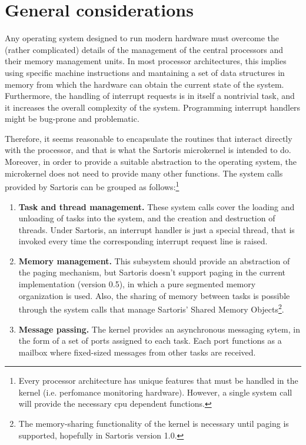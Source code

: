 \documentclass[11pt, letterpaper, twoside, english]{book}
\begin{document}
\section{General considerations}
Any operating system designed to run modern hardware must overcome the (rather complicated) details of the management of the central processors and their memory management units. In most processor architectures, this implies using specific machine instructions and mantaining a set of data structures in memory from which the hardware can obtain the current state of the system. Furthermore, the handling of interrupt requests is in itself a nontrivial task, and it increases the overall complexity of the system. Programming interrupt handlers might be bug-prone and problematic.

Therefore, it seems reasonable to encapsulate the routines that interact directly with the processor, and that is what the Sartoris microkernel is intended to do. Moreover, in order to provide a suitable abstraction to the operating system, the microkernel does not need to provide many other functions. The system calls provided by Sartoris can be grouped as follows:\footnote{Every processor architecture has unique features that must be handled in the kernel (i.e. perfomance monitoring hardware). However, a single system call will provide the necessary cpu dependent functions. }

\begin{enumerate}
\item[]\textbf{Task and thread management.} These system calls cover the loading and unloading of tasks into the system, and the creation and destruction of threads. Under Sartoris, an interrupt handler is just a special thread, that is invoked every time the corresponding interrupt request line is raised.
\item[]\textbf{Memory management.} This subsystem should provide an abstraction of the paging mechanism, but Sartoris doesn't support paging in the current implementation (version 0.5), in which a pure segmented memory organization is used. Also, the sharing of memory between tasks is possible through the system calls that manage Sartoris' Shared Memory Objects\footnote{The memory-sharing functionality of the kernel is necessary until paging is supported, hopefully in Sartoris version 1.0.}.
\item[]\textbf{Message passing.} The kernel provides an asynchronous messaging sytem, in the form of a set of ports assigned to each task. Each port functions as a mailbox where fixed-sized messages from other tasks are received.
\end{enumerate}
\end{document}
